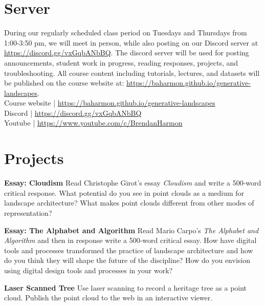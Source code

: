 \documentclass[11pt,article,oneside]{memoir}
\begin{document}
\clearpage

\section{Server}

During our regularly scheduled class period
on Tuesdays and Thursdays from 1:00-3:50 pm,
we will meet in person, while also posting
on our Discord server at \url{https://discord.gg/vxGqbANbBQ}.
The discord server will be used for posting
announcements, student work in progress, 
reading responses, projects, and troubleshooting. 
All course content including tutorials, lectures, and datasets
will be published on the course website at:
\url{https://baharmon.github.io/generative-landscapes}.\\

\noindent
Course website | \url{https://baharmon.github.io/generative-landscapes}\\
Discord | \url{https://discord.gg/vxGqbANbBQ}\\
Youtube | \url{https://www.youtube.com/c/BrendanHarmon}\\

\section{Projects}

\noindent \textbf{Essay: Cloudism}
Read Christophe Girot's essay \emph{Cloudism}
and write a 500-word critical response. 
What potential do you see in point clouds
as a medium for landscape architecture?
What makes point clouds different
from other modes of representation?
\nocite{*} \printbibliography[keyword=a, heading=none]

\noindent \textbf{Essay: The Alphabet and Algorithm}
Read Mario Carpo's \emph{The Alphabet and Algorithm}
and then in response write a 500-word critical essay.
How have digital tools and processes transformed 
the practice of landscape architecture
and how do you think they will shape 
the future of the discipline?
How do you envision using
digital design tools and processes in your work?

\nocite{*} \printbibliography[keyword=b, heading=none]

\noindent \textbf{Laser Scanned Tree}
Use laser scanning to record a heritage tree as a point cloud. 
Publish the point cloud to the web in an interactive viewer.
\\
\end{document}
